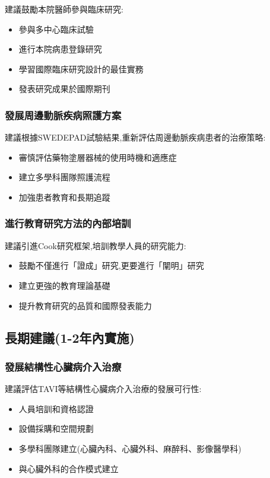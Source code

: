 \documentclass[12pt,a4paper]{article}
\begin{document}
建議鼓勵本院醫師參與臨床研究:
\begin{itemize}[nosep]
    \item 參與多中心臨床試驗
    \item 進行本院病患登錄研究
    \item 學習國際臨床研究設計的最佳實務
    \item 發表研究成果於國際期刊
\end{itemize}

\subsubsection{發展周邊動脈疾病照護方案}

建議根據SWEDEPAD試驗結果,重新評估周邊動脈疾病患者的治療策略:
\begin{itemize}[nosep]
    \item 審慎評估藥物塗層器械的使用時機和適應症
    \item 建立多學科團隊照護流程
    \item 加強患者教育和長期追蹤
\end{itemize}

\subsubsection{進行教育研究方法的內部培訓}

建議引進Cook研究框架,培訓教學人員的研究能力:
\begin{itemize}[nosep]
    \item 鼓勵不僅進行「證成」研究,更要進行「闡明」研究
    \item 建立更強的教育理論基礎
    \item 提升教育研究的品質和國際發表能力
\end{itemize}

\subsection{長期建議(1-2年內實施)}

\subsubsection{發展結構性心臟病介入治療}

建議評估TAVI等結構性心臟病介入治療的發展可行性:
\begin{itemize}[nosep]
    \item 人員培訓和資格認證
    \item 設備採購和空間規劃
    \item 多學科團隊建立(心臟內科、心臟外科、麻醉科、影像醫學科)
    \item 與心臟外科的合作模式建立
\end{itemize}
\end{document}
